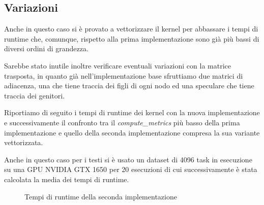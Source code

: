 \documentclass[../relazione.tex]{subfiles}
\begin{document}
\subsection{Variazioni}
Anche in questo caso si è provato a vettorizzare il kernel per abbassare i tempi di runtime che, comunque, rispetto alla prima implementazione sono già più bassi di diversi ordini di grandezza.

Sarebbe stato inutile inoltre verificare eventuali variazioni con la matrice trasposta, in quanto già nell'implementazione base sfruttiamo due matrici di adiacenza, una che tiene traccia dei figli di ogni nodo ed una speculare che tiene traccia dei genitori.

Riportiamo di seguito i tempi di runtime dei kernel con la nuova implementazione e successivamente il confronto tra il \textit{compute\_metrics} più basso della prima implementazione e quello della seconda implementazione compresa la sua variante vettorizzata.

Anche in questo caso per i testi si è usato un dataset di 4096 task in esecuzione su una GPU NVIDIA GTX 1650 per 20 esecuzioni di cui successivamente è stata calcolata la media dei tempi di runtime.\\

\begin{figure}[h]
\caption{Tempi di runtime della seconda implementazione}
\end{figure}

\\
\end{document}
